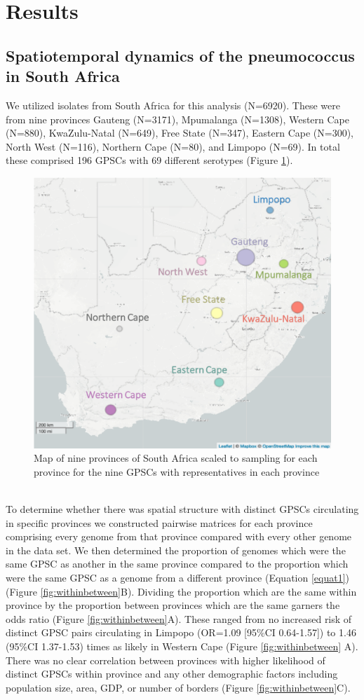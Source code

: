 \documentclass{article}
\begin{document}
\section{Results}
\subsection{Spatiotemporal dynamics of the pneumococcus in South Africa}
We utilized isolates from South Africa for this analysis (N=6920). These were from nine provinces Gauteng (N=3171), Mpumalanga (N=1308), Western Cape (N=880), KwaZulu-Natal (N=649), Free State (N=347), Eastern Cape (N=300), North West (N=116), Northern Cape (N=80), and Limpopo (N=69). In total these comprised 196 GPSCs with 69 different serotypes (Figure \ref{fig:map}). 
\begin{figure}[H]
\centering
    \includegraphics[width=\textwidth]{scaledmap.png}
    \caption{Map of nine provinces of South Africa scaled to sampling for each province for the nine GPSCs with representatives in each province}
    \label{fig:map}
\end{figure}
\\To determine whether there was spatial structure with distinct GPSCs circulating in specific provinces we constructed pairwise matrices for each province comprising every genome from that province compared with every other genome in the data set. We then determined the proportion of genomes which were the same GPSC as another in the same province compared to the proportion which were the same GPSC as a genome from a different province (Equation \ref{equat1})(Figure \ref{fig:withinbetween}B). Dividing the proportion which are the same within province by the proportion between provinces which are the same garners the odds ratio (Figure \ref{fig:withinbetween}A). These ranged from no increased risk of distinct GPSC pairs circulating in Limpopo (OR=1.09 [95\%CI 0.64-1.57]) to 1.46 (95\%CI 1.37-1.53) times as likely in Western Cape (Figure \ref{fig:withinbetween} A). There was no clear correlation between provinces with higher likelihood of distinct GPSCs within province and any other demographic factors including population size, area, GDP, or number of borders (Figure \ref{fig:withinbetween}C). 
\end{document}
